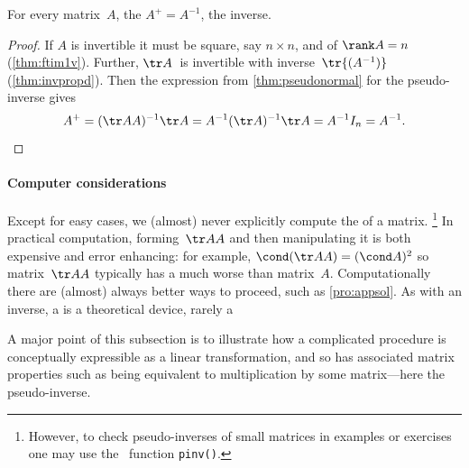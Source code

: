 \begin{theorem} \label{thm:pinvinv}
For every  matrix~\(A\), the  \(A^+=A^{-1}\), the inverse.
\end{theorem}
\begin{proof} 
If \(A\) is invertible it must be square, say \(n\times n\), and of \(\rank A=n\) (\cref{thm:ftim1v}).
Further, \(\tr A\)~is invertible with inverse~\(\tr{(A^{-1})}\) (\cref{thm:invpropd}).
Then the expression from \cref{thm:pseudonormal} for the pseudo-inverse gives
\begin{equation*}
A^+=(\tr AA)^{-1}\tr A
=A^{-1}(\tr A)^{-1}\tr A
=A^{-1}I_n=A^{-1}.
\end{equation*}
\end{proof}




\paragraph{Computer considerations} 
Except for easy cases, we (almost) never explicitly compute the  of a matrix.%
\footnote{However, to check pseudo-inverses of small matrices in examples or exercises one may use the \script\ function \texttt{pinv()}.}
In practical computation, forming~\(\tr AA\) and then manipulating it is both expensive and error enhancing: for example, \(\cond(\tr AA)=(\cond A)^2\) so matrix~\(\tr AA\) typically has a much worse  than matrix~\(A\).
Computationally there are (almost) always better ways to proceed, such as \cref{pro:appsol}.
As with an inverse, a  is a theoretical device, rarely a 

A major point of this subsection is to illustrate how a complicated procedure is conceptually expressible as a linear transformation, and so has associated matrix properties such as being equivalent to multiplication by some matrix---here the pseudo-inverse.

